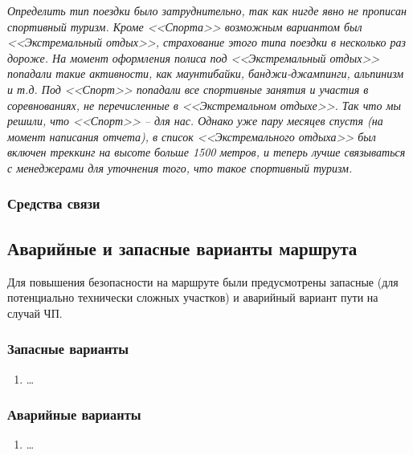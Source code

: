 			\textit{Определить тип поездки было затруднительно, так как нигде явно не прописан спортивный туризм.
			Кроме <<Спорта>> возможным вариантом был <<Экстремальный отдых>>, страхование этого типа поездки в
			несколько раз дороже. На момент оформления полиса под <<Экстремальный отдых>> попадали такие активности,
			как маунтибайки, банджи-джампинги, альпинизм и т.д. Под <<Спорт>> попадали все спортивные занятия и
			участия в соревнованиях, не перечисленные в <<Экстремальном отдыхе>>. Так что мы решили, что
			<<Спорт>> -- для нас. Однако уже пару месяцев спустя (на момент написания отчета), в список
			<<Экстремального отдыха>> был включен треккинг на высоте больше 1500 метров, и теперь лучше связываться
			с менеджерами для уточнения того, что такое спортивный туризм.}

		\subsubsection{Средства связи}
			

	\subsection{Аварийные и запасные варианты маршрута}
		Для повышения безопасности на маршруте были предусмотрены запасные (для потенциально технически сложных участков) и 
		аварийный вариант пути  на случай ЧП.

		\subsubsection{Запасные варианты}
			\begin{enumerate}
				\item \dots
			\end{enumerate}


		\subsubsection{Аварийные варианты}
			\begin{enumerate}
				\item \dots
			\end{enumerate}
